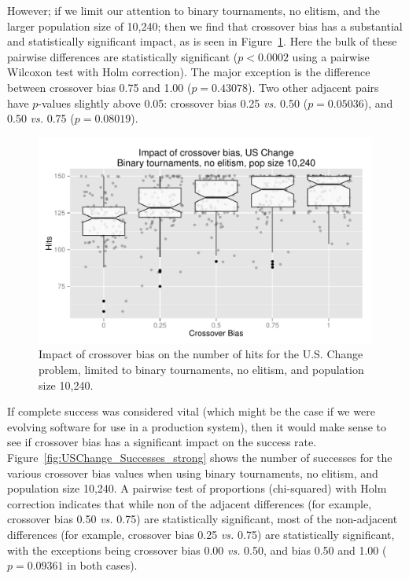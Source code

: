 \documentclass{sig-alternate}
\begin{document}
%
%
%
%

However; if we limit our attention to binary tournaments, no elitism, and the larger population size of 10,240; then we
find that crossover bias has a substantial and statistically significant impact, as is seen in
Figure~\ref{fig:USChange_Hits_strong}. Here the bulk of these pairwise differences are statistically significant
($p<0.0002$ using a pairwise Wilcoxon test with Holm correction). The major exception is the difference between
crossover bias 0.75 and 1.00 ($p=0.43078$). Two other adjacent pairs have $p$-values slightly above 0.05: crossover bias
0.25 \emph{vs.} 0.50 ($p=0.05036$), and 0.50 \emph{vs.} 0.75 ($p=0.08019$).

\begin{figure}
\centering
\includegraphics[width=0.45 \textwidth]{Plots/US_change_hits_strong.pdf}
\caption{Impact of crossover bias on the number of hits for the U.S. Change problem, limited to binary 
tournaments, no elitism, and population size 10,240.}
\label{fig:USChange_Hits_strong}
\end{figure}

%
%
%
%

If complete success was considered vital (which might be the case if we were evolving software for use in a production
system), then it would make sense to see if crossover bias has a significant impact on the success rate.
Figure~\ref{fig:USChange_Successes_strong} shows the number of successes for the various crossover bias values when
using binary tournaments, no elitism, and population size 10,240. A pairwise test of proportions (chi-squared) with
Holm correction indicates that while non of the adjacent differences (for example, crossover bias 0.50 \emph{vs.} 0.75)
are statistically significant, most of the non-adjacent differences (for example, crossover bias 0.25 \emph{vs.} 0.75)
are statistically significant, with the exceptions being crossover bias 0.00 \emph{vs.} 0.50, and bias 0.50 and 1.00
($p=0.09361$ in both cases).
\end{document}
